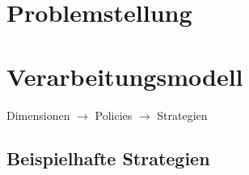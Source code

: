 \cite{BeFiMu2006PubSubQoS}
\cite{KostasKatrinis2005}

\section{Problemstellung}

\section{Verarbeitungsmodell}
Dimensionen $\rightarrow$ Policies $\rightarrow$ Strategien

\subsection{Beispielhafte Strategien}
